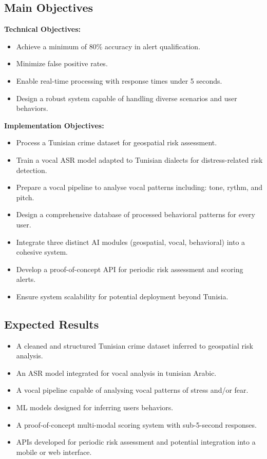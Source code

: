 \documentclass[12pt,a4paper,oneside,english]{book}
\begin{document}
{\subsection{Main Objectives}

\textbf{Technical Objectives:}
\begin{itemize}
    \item Achieve a minimum of 80\% accuracy in alert qualification.
    \item Minimize false positive rates. 
    \item Enable real-time processing  with response times under 5 seconds.
    \item Design a robust system capable of handling diverse scenarios and user behaviors.
\end{itemize}

\textbf{Implementation Objectives:}
\begin{itemize}

\item Process a Tunisian crime dataset for geospatial risk assessment.
\item Train a vocal ASR model adapted to Tunisian dialects for distress-related risk detection.
\item Prepare a vocal pipeline to analyse vocal patterns including: tone, rythm, and pitch.
\item Design a comprehensive database of processed behavioral patterns for every user.
   \item Integrate three distinct AI modules (geospatial, vocal, behavioral) into a cohesive system.
    \item Develop a proof-of-concept API for periodic risk assessment and scoring alerts.
    \item Ensure system scalability for potential deployment beyond Tunisia.
\end{itemize}

\subsection{Expected Results}
\begin{itemize}
\item A cleaned and structured Tunisian crime dataset inferred to geospatial risk analysis.
\item An ASR model integrated for vocal analysis in tunisian Arabic. %
\item A vocal pipeline capable of analysing vocal patterns of stress and/or fear.
\item ML models designed for inferring  users behaviors.
\item A proof-of-concept multi-modal scoring system with sub-5-second responses.
\item APIs developed for periodic risk assessment and potential integration into a mobile or web interface.
\end{itemize}


}
\end{document}
